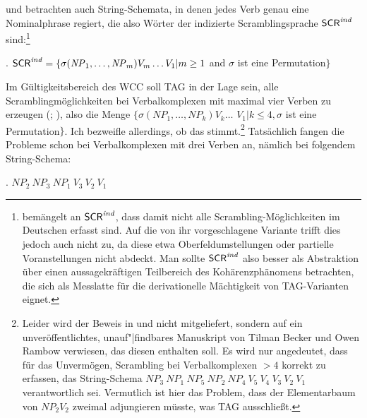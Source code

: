 \cite{Becker:Joshi:Rambow:91} und \cite{Joshi:Becker:Rambow:00} betrachten auch String-Schemata, in denen jedes Verb genau eine Nominalphrase regiert, die also Wörter der indizierte Scramblingsprache $\mathsf{SCR}^{\mathit{ind}}$ sind:\footnote{\citet[200]{Kallmeyer:05} bemängelt an  $\mathsf{SCR}^{\mathit{ind}}$, dass damit nicht alle Scrambling-Möglichkeiten im Deutschen erfasst sind. Auf die von ihr vorgeschlagene Variante trifft dies jedoch auch nicht zu, da diese etwa Oberfeldumstellungen oder partielle Voranstellungen nicht abdeckt. Man sollte $\mathsf{SCR}^{\mathit{ind}}$ also besser als Abstraktion über einen aussagekräftigen Teilbereich des Kohärenzphänomens betrachten, die sich als Messlatte für die derivationelle Mächtigkeit von TAG-Varianten eignet.}

\ex. $\mathsf{SCR}^{\mathit{ind}} = \{ \sigma(\mathit{NP}_1,\ldots,\mathit{NP}_m) V_m \ldots V_1 | m \geq 1$ and $\sigma$ ist eine Permuta\-tion$\}$ 

Im Gültigkeitsbereich des WCC soll TAG in der Lage sein, alle Scramblingmöglichkeiten bei Verbalkomplexen mit maximal vier Verben zu erzeugen (\citealt[23]{Becker:Joshi:Rambow:91}; \citealt[177]{Joshi:Becker:Rambow:00}), also die Menge $\{ \sigma(\mathit{NP}_1, \ldots, \mathit{NP}_k) V_k \ldots$ $V_1 | k \leq 4, \sigma$ ist eine Permuta\-tion$\}$. Ich bezweifle allerdings, ob das stimmt.\footnote{Leider wird der Beweis in \citet{Becker:Joshi:Rambow:91} und \citet{Joshi:Becker:Rambow:00} nicht mitgeliefert, sondern auf ein unveröffentlichtes, unauf"|findbares Manuskript von Tilman Becker und Owen Rambow verwiesen, das diesen enthalten soll. Es wird nur angedeutet, dass für das Unvermögen, Scrambling bei Verbalkomplexen $> 4$ korrekt zu erfassen, das String-Schema $\mathit{NP}_3 ~ \mathit{NP}_1 ~ \mathit{NP}_5 ~ \mathit{NP}_2 ~ \mathit{NP}_4 ~ V_5 ~ V_4 ~ V_3 ~ V_2 ~ V_1$ verantwortlich sei.  Vermutlich ist hier das Problem, dass der Elementarbaum von $\mathit{NP}_2 V_2$ zweimal adjungieren müsste, was TAG ausschlie\ss t.} Tatsächlich fangen die Probleme schon bei Verbalkomplexen mit drei Verben an, nämlich bei folgendem String-Schema:

\ex. $\mathit{NP}_2 ~ \mathit{NP}_3 ~ \mathit{NP}_1 ~ V_3 ~ V_2 ~ V_1$\label{ex-schema-231} 

